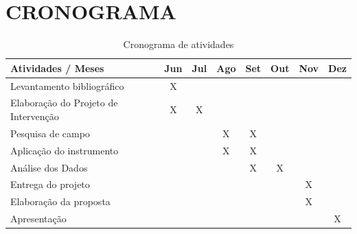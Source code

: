 \chapter{CRONOGRAMA}
\begin{table}[htb]
\centering
\caption{Cronograma de atividades}
\begin{tabular}{|l|c|c|c|c|c|c|c|}
\hline
\textbf{Atividades / Meses} & \textbf{Jun} & \textbf{Jul} & \textbf{Ago} & \textbf{Set} & \textbf{Out} & \textbf{Nov} & \textbf{Dez} \\ \hline
Levantamento bibliográfico & X & & & & & & \\ \hline
Elaboração do Projeto de Intervenção & X & X & & & & & \\ \hline
Pesquisa de campo & & & X & X & & & \\ \hline
Aplicação do instrumento & & & X & X & & & \\ \hline
Análise dos Dados & & & & X & X & & \\ \hline
Entrega do projeto & & & & & & X & \\ \hline
Elaboração da proposta & & & & & & X & \\ \hline
Apresentação & & & & & & & X \\ \hline
\end{tabular}
\end{table}
